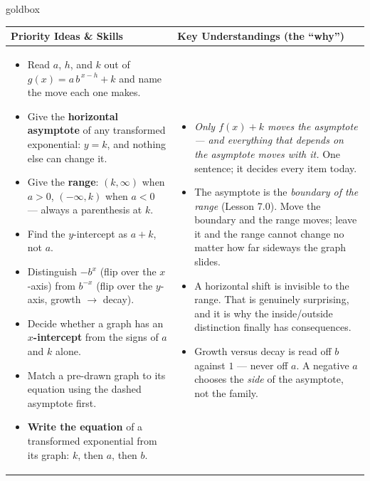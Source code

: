 \documentclass[10pt]{article}
\begin{document}
\renewcommand{\arraystretch}{1.4}
\begin{skillbox}{goldbox}
\begin{tabularx}{\linewidth}{@{}X|X@{}}
\textbf{Priority Ideas \& Skills} & \textbf{Key Understandings (the ``why'')} \\[2pt]
\hline
\vspace{-6pt}
\begin{itemize}[leftmargin=1.1em, nosep, after=\vspace{2pt}]
  \item Read $a$, $h$, and $k$ out of $g(x)=a\,b^{\,x-h}+k$ and name the move each one makes.
  \item Give the \textbf{horizontal asymptote} of any transformed exponential: $y=k$, and nothing else can change it.
  \item Give the \textbf{range}: $(k,\infty)$ when $a>0$, $(-\infty,k)$ when $a<0$ --- always a parenthesis at $k$.
  \item Find the $y$-intercept as $a+k$, not $a$.
  \item Distinguish $-b^{x}$ (flip over the $x$-axis) from $b^{-x}$ (flip over the $y$-axis, growth $\to$ decay).
  \item Decide whether a graph has an \textbf{$x$-intercept} from the signs of $a$ and $k$ alone.
  \item Match a pre-drawn graph to its equation using the dashed asymptote first.
  \item \textbf{Write the equation} of a transformed exponential from its graph: $k$, then $a$, then $b$.
\end{itemize}
&
\vspace{-6pt}
\begin{itemize}[leftmargin=1.1em, nosep, after=\vspace{2pt}]
  \item \emph{Only $f(x)+k$ moves the asymptote --- and everything that depends on the asymptote moves with it.} One sentence; it decides every item today.
  \item The asymptote is the \emph{boundary of the range} (Lesson 7.0). Move the boundary and the range moves; leave it and the range cannot change no matter how far sideways the graph slides.
  \item A horizontal shift is invisible to the range. That is genuinely surprising, and it is why the inside/outside distinction finally has consequences.
  \item Growth versus decay is read off $b$ against $1$ --- never off $a$. A negative $a$ chooses the \emph{side} of the asymptote, not the family.

\end{itemize}
\end{tabularx}
\end{skillbox}
\end{document}
